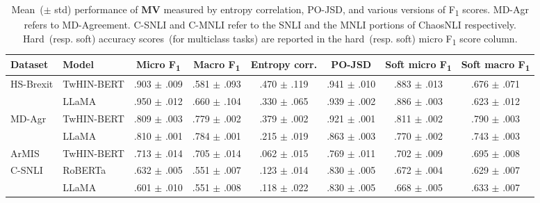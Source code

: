 \documentclass[shortpaper]{clv2025}
\newcommand{\pojsd}{PO-JSD\xspace}
\newcommand{\methname}[1]{\textbf{#1}}  %
\begin{document}
\begin{table}[!h]\scriptsize
  \caption{Mean~($\pm$ std) performance of \methname{MV} measured by entropy
    correlation, \pojsd, and various versions of F\textsubscript{1} scores.
    MD-Agr refers to MD-Agreement. C-SNLI and C-MNLI refer to the SNLI and the
    MNLI portions of ChaosNLI respectively. Hard~(resp. soft) accuracy
    scores~(for multiclass tasks) are reported in the hard~(resp. soft) micro
    F\textsubscript{1} score column.}\label{tbl:mv-results}
  \begin{tabular}{@{}ll*{6}{c}@{}}
  \toprule
  Dataset                       & Model      & Micro F\textsubscript{1} & Macro F\textsubscript{1} & Entropy corr.   & \pojsd          & Soft micro F\textsubscript{1} & Soft macro F\textsubscript{1} \\
  \midrule
  \multirow[c]{2}{*}{HS-Brexit} & TwHIN-BERT & .903 $\pm$ .009          & .581 $\pm$ .093          & .470 $\pm$ .119 & .941 $\pm$ .010 & .883 $\pm$ .013               & .676 $\pm$ .071               \\
                                & LLaMA      & .950 $\pm$ .012          & .660 $\pm$ .104          & .330 $\pm$ .065 & .939 $\pm$ .002 & .886 $\pm$ .003               & .623 $\pm$ .012               \\
  \cmidrule{1-8}
  \multirow[c]{2}{*}{MD-Agr}    & TwHIN-BERT & .809 $\pm$ .003          & .779 $\pm$ .002          & .379 $\pm$ .002 & .921 $\pm$ .001 & .811 $\pm$ .002               & .790 $\pm$ .003               \\
                                & LLaMA      & .810 $\pm$ .001          & .784 $\pm$ .001          & .215 $\pm$ .019 & .863 $\pm$ .003 & .770 $\pm$ .002               & .743 $\pm$ .003               \\
  \cmidrule{1-8}
  ArMIS                         & TwHIN-BERT & .713 $\pm$ .014          & .705 $\pm$ .014          & .062 $\pm$ .015 & .769 $\pm$ .011 & .702 $\pm$ .009               & .695 $\pm$ .008               \\
  \cmidrule{1-8}
  \multirow[c]{2}{*}{C-SNLI}    & RoBERTa    & .632 $\pm$ .005          & .551 $\pm$ .007          & .123 $\pm$ .014 & .830 $\pm$ .005 & .672 $\pm$ .004               & .629 $\pm$ .007               \\
                                & LLaMA      & .601 $\pm$ .010          & .551 $\pm$ .008          & .118 $\pm$ .022 & .830 $\pm$ .005 & .668 $\pm$ .005               & .633 $\pm$ .007               \\
  \cmidrule{1-8}

\end{tabular}
\end{table}
\end{document}
